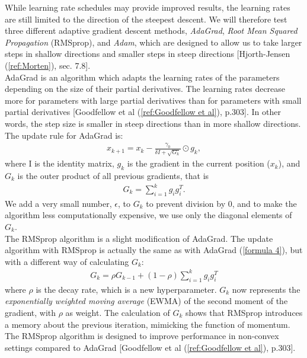 \documentclass[english,notitlepage,reprint,nofootinbib]{revtex4-1}  %
\begin{document}
While learning rate schedules may provide improved results, the learning rates  are still %
limited to the direction of the steepest descent. We will therefore test %
three different adaptive gradient descent methods, \textit{AdaGrad}, \textit{Root Mean Squared Propagation} (RMSprop), and \textit{Adam}, which are designed to allow us to take larger steps in shallow directions and smaller steps in steep directions [Hjorth-Jensen (\ref{ref:Morten}), sec. 7.8]. %
\\

AdaGrad is an algorithm which adapts the learning rates of the parameters depending on the size of their partial derivatives. The learning rates decrease more for parameters with large partial derivatives than for parameters with small partial derivatives [Goodfellow et al (\ref{ref:Goodfellow et al}), p.303]. In other words, the step size is smaller in steep directions than in more shallow directions. The update rule for AdaGrad is:
\begin{align} \label{formula 4}
    x_{k+1} = x_{k} - \frac{\gamma_{0}}{\delta I + \sqrt{G_{k}}}\odot g_{k},
\end{align}
where I is the identity matrix, $g_{k}$ is the gradient in the current position ($x_{k}$), and $G_{k}$ is the outer product of all previous gradients, that is
\begin{align} 
    G_{k} = \sum_{i=1}^{k} g_{i}g_{i}^{T}.
\end{align}
We add a very small number, $\epsilon$, to $G_{k}$ to prevent division by 0, and to make the algorithm less computationally expensive, we use only the diagonal elements of $G_{k}$.
\\

The RMSprop algorithm is a slight modification of AdaGrad. The update algorithm with RMSprop is actually the same as with AdaGrad (\ref{formula 4}), but with a different way of calculating $G_{k}$:
\begin{align} \label{formula 6}
    G_{k} = \rho G_{k-1} + (1 - \rho) \sum_{i=1}^{k} g_{i}g_{i}^{T}
\end{align}
where $\rho$ is the decay rate, which is a new hyperparameter. $G_{k}$ now represents the \textit{exponentially weighted moving average} (EWMA) of the second moment of the gradient, with $\rho$ as weight. %
The calculation of $G_{k}$ shows that RMSprop introduces a memory about the previous iteration, mimicking the function of momentum. The RMSprop algorithm is designed to improve performance in non-convex settings compared to AdaGrad [Goodfellow et al (\ref{ref:Goodfellow et al}), p.303]. \\
\end{document}
